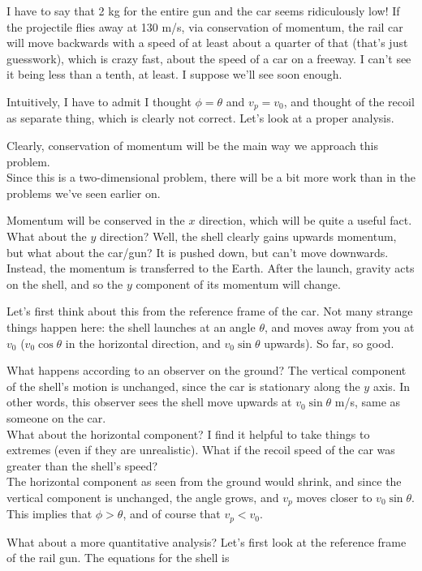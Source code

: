 \documentclass[12pt,a4paper]{report}
\begin{document}
I have to say that 2 kg for the entire gun and the car seems ridiculously low! If the projectile flies away at 130 m/s, via conservation of momentum, the rail car will move backwards with a speed of at least about a quarter of that (that's just guesswork), which is crazy fast, about the speed of a car on a freeway. I can't see it being less than a tenth, at least. I suppose we'll see soon enough.

Intuitively, I have to admit I thought $\phi = \theta$ and $v_p = v_0$, and thought of the recoil as separate thing, which is clearly not correct. Let's look at a proper analysis.

Clearly, conservation of momentum will be the main way we approach this problem.\\
Since this is a two-dimensional problem, there will be a bit more work than in the problems we've seen earlier on.

Momentum will be conserved in the $x$ direction, which will be quite a useful fact. What about the $y$ direction? Well, the shell clearly gains upwards momentum, but what about the car/gun? It is pushed down, but can't move downwards. Instead, the momentum is transferred to the Earth. After the launch, gravity acts on the shell, and so the $y$ component of its momentum will change.

Let's first think about this from the reference frame of the car. Not many strange things happen here: the shell launches at an angle $\theta$, and moves away from you at $v_0$ ($v_0 \cos \theta$ in the horizontal direction, and $v_0 \sin \theta$ upwards). So far, so good.

What happens according to an observer on the ground? The vertical component of the shell's motion is unchanged, since the car is stationary along the $y$ axis. In other words, this observer sees the shell move upwards at $v_0 \sin \theta$ m/s, same as someone on the car.\\
What about the horizontal component? I find it helpful to take things to extremes (even if they are unrealistic). What if the recoil speed of the car was greater than the shell's speed?\\
The horizontal component as seen from the ground would shrink, and since the vertical component is unchanged, the angle grows, and $v_p$ moves closer to $v_0 \sin \theta$.\\
This implies that $\phi > \theta$, and of course that $v_p < v_0$.

What about a more quantitative analysis? Let's first look at the reference frame of the rail gun. The equations for the shell is
\end{document}

